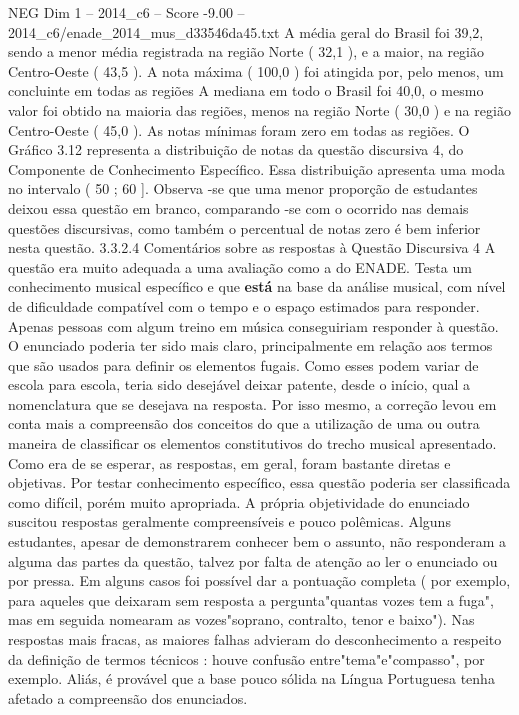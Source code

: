\begin{textsample}{NEG Dim 1 – 2014\_c6 – Score -9.00 – 2014\_c6/enade\_2014\_mus\_d33546da45.txt}
A média geral do Brasil foi 39,2, sendo a menor média registrada na região Norte ( 32,1 ), e a maior, na região Centro-Oeste ( 43,5 ).
A nota máxima ( 100,0 ) foi atingida por, pelo menos, um concluinte em todas as regiões A mediana em todo o Brasil foi 40,0, o mesmo valor foi obtido na maioria das regiões, menos na região Norte ( 30,0 ) e na região Centro-Oeste ( 45,0 ).
As notas mínimas foram zero em todas as regiões.
O Gráfico 3.12 representa a distribuição de notas da questão discursiva 4, do Componente de Conhecimento Específico.
Essa distribuição apresenta uma moda no intervalo ( 50 ; 60 ].
Observa -se que uma menor proporção de estudantes deixou essa questão em branco, comparando -se com o ocorrido nas demais questões discursivas, como também o percentual de notas zero é bem inferior nesta questão. 3.3.2.4 Comentários sobre as respostas à Questão Discursiva 4 A questão era muito adequada a uma avaliação como a do ENADE.
Testa um conhecimento musical específico e que \textbf{está} na base da análise musical, com nível de dificuldade compatível com o tempo e o espaço estimados para responder.
Apenas pessoas com algum treino em música conseguiriam responder à questão.
O enunciado poderia ter sido mais claro, principalmente em relação aos termos que são usados para definir os elementos fugais.
Como esses podem variar de escola para escola, teria sido desejável deixar patente, desde o início, qual a nomenclatura que se desejava na resposta.
Por isso mesmo, a correção levou em conta mais a compreensão dos conceitos do que a utilização de uma ou outra maneira de classificar os elementos constitutivos do trecho musical apresentado.
Como era de se esperar, as respostas, em geral, foram bastante diretas e objetivas.
Por testar conhecimento específico, essa questão poderia ser classificada como difícil, porém muito apropriada.
A própria objetividade do enunciado suscitou respostas geralmente compreensíveis e pouco polêmicas.
Alguns estudantes, apesar de demonstrarem conhecer bem o assunto, não responderam a alguma das partes da questão, talvez por falta de atenção ao ler o enunciado ou por pressa.
Em alguns casos foi possível dar a pontuação completa ( por exemplo, para aqueles que deixaram sem resposta a pergunta"quantas vozes tem a fuga", mas em seguida nomearam as vozes"soprano, contralto, tenor e baixo").
Nas respostas mais fracas, as maiores falhas advieram do desconhecimento a respeito da definição de termos técnicos : houve confusão entre"tema"e"compasso", por exemplo.
Aliás, é provável que a base pouco sólida na Língua Portuguesa tenha afetado a compreensão dos enunciados.

\end{textsample}
